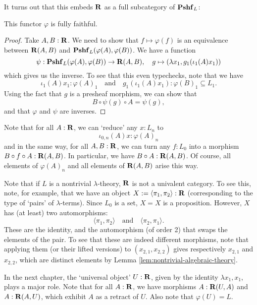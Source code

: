 It turns out that this embeds $ \mathbf{R} $ as a full subcategory of $ \mathbf{Pshf}_{L} $:
\begin{lemma}
  This functor $ \varphi $ is fully faithful.
\end{lemma}
\begin{proof}
  Take $ A, B : \mathbf{R} $. We need to show that $ f \mapsto \varphi(f) $ is an equivalence between $ \mathbf{R}(A, B) $ and $ \mathbf{Pshf}_{L}(\varphi(A), \varphi(B)) $. We have a function
  \[ \psi: \mathbf{Pshf}_{L}(\varphi(A), \varphi(B)) \to \mathbf{R}(A, B), \quad g \mapsto (\lambda x_1, g_1(\iota_1(A) x_1)) \]
  which gives us the inverse. To see that this even typechecks, note that we have
  \[ \iota_1(A) x_1 : \varphi(A)_1 \quad \text{and} \quad g_1(\iota_1(A) x_1) : \varphi(B)_1 \subseteq L_1. \]
  Using the fact that $ g $ is a presheaf morphism, we can show that
  \[ B \circ \psi(g) \circ A = \psi(g), \]
  and that $ \varphi $ and $ \psi $ are inverses.
\end{proof}

\begin{remark}
  Note that for all $ A : \mathbf{R} $, we can `reduce' any $ x: L_n $ to
  \[ \iota_{0, n}(A) x : \varphi(A)_n \]
  and in the same way, for all $ A, B: \mathbf{R} $, we can turn any $ f: L_0 $ into a morphism $ B \circ f \circ A : \mathbf{R}(A, B) $. In particular, we have $ B \circ A : \mathbf{R}(A, B) $.
  Of course, all elements of $ \varphi(A)_n $ and all elements of $ \mathbf{R}(A, B) $ arise this way.
\end{remark}

\begin{remark}
  Note that if $ L $ is a nontrivial $ \lambda $-theory, $ \mathbf{R} $ is not a univalent category. To see this, note, for example, that we have an object $ X := \langle \pi_1, \pi_2 \rangle : \mathbf{R} $ (corresponding to the type of `pairs' of $ \lambda $-terms). Since $ L_0 $ is a set, $ X = X $ is a proposition. However, $ X $ has (at least) two automorphisms:
  \[ \langle \pi_1, \pi_2 \rangle \quad \text{and} \quad \langle \pi_2, \pi_1 \rangle. \]
  These are the identity, and the automorphism (of order 2) that swaps the elements of the pair. To see that these are indeed different morphisms, note that applying them (or their lifted versions) to $ (x_{2, 1}, x_{2, 2}) $ gives respectively $ x_{2, 1} $ and $ x_{2, 2} $, which are distinct elements by Lemma \ref{lem:nontrivial-algebraic-theory}.
\end{remark}

In the next chapter, the `universal object' $ U : \mathbf{R} $, given by the identity $ \lambda x_1, x_1 $, plays a major role. Note that for all $ A: \mathbf{R} $, we have morphisms $ A: \mathbf{R}(U, A) $ and $ A: \mathbf{R}(A, U) $, which exhibit $ A $ as a retract of $ U $. Also note that $ \varphi(U) = L $.

